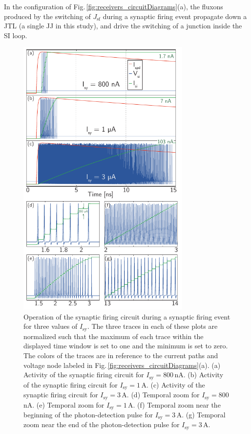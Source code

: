 \documentclass[twocolumn]{article}
\begin{document}
In the configuration of Fig.\,\ref{fig:receivers_circuitDiagrams}(a), the fluxons produced by the switching of $J_{\mathrm{sf}}$ during a synaptic firing event propagate down a JTL (a single JJ in this study), and drive the switching of a junction inside the SI loop.
\begin{figure}[t!]
	\centerline{\includegraphics[width=8.6cm]{_receivers_sffg_firingDetail_small.pdf}}
	\caption{\label{fig:receivers_sffg_firingDetail} Operation of the synaptic firing circuit during a synaptic firing event for three values of $I_{\mathrm{sy}}$. The three traces in each of these plots are normalized such that the maximum of each trace within the displayed time window is set to one and the minimum is set to zero. The colors of the traces are in reference to the current paths and voltage node labeled in Fig.\,\ref{fig:receivers_circuitDiagrams}(a). (a) Activity of the synaptic firing circuit for $I_{\mathrm{sy}} = 800$\,nA. (b) Activity of the synaptic firing circuit for $I_{\mathrm{sy}} = 1$\,\textmu A. (c) Activity of the synaptic firing circuit for $I_{\mathrm{sy}} = 3$\,\textmu A. (d) Temporal zoom for $I_{\mathrm{sy}} = 800$\,nA. (e) Temporal zoom for $I_{\mathrm{sy}} = 1$\,\textmu A. (f) Temporal zoom near the beginning of the photon-detection pulse for $I_{\mathrm{sy}} = 3$\,\textmu A. (g) Temporal zoom near the end of the photon-detection pulse for $I_{\mathrm{sy}} = 3$\,\textmu A.} 
\end{figure}  
\end{document}
